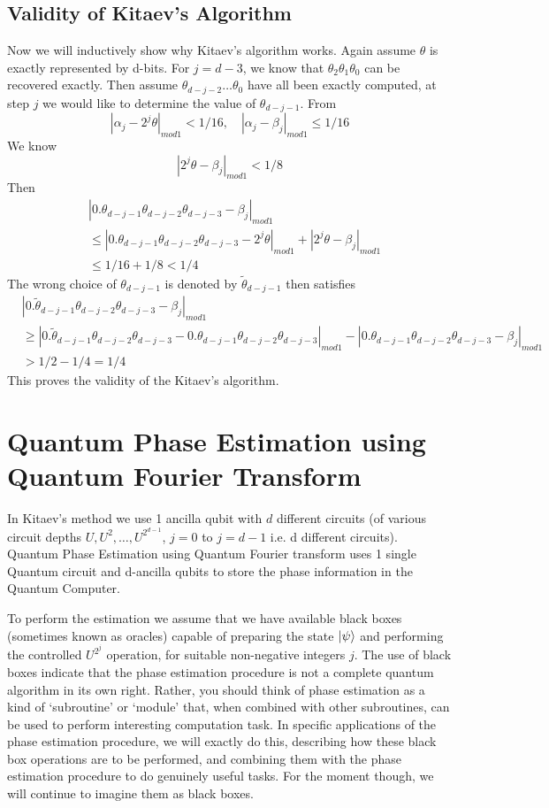 \subsection{Validity of Kitaev's Algorithm}
Now we will inductively show why Kitaev's algorithm works. Again assume $\theta$ is exactly represented by d-bits. For $j=d-3$, we know that $\theta_2\theta_1\theta_0$ can be recovered exactly. Then assume $\theta_{d-j-2}\ldots \theta_0$ have all been exactly computed, at step $j$ we would like to determine the value of $\theta_{d-j-1}$. From
\[
|\alpha_j-2^j\theta|_{mod 1}<1/16, \quad |\alpha_j-\beta_j|_{mod 1}\leq 1/16
\]
We know
\[
|2^j\theta-\beta_j|_{mod 1}<1/8
\]
Then
\begin{align*}
    &|0.\theta_{d-j-1}\theta_{d-j-2}\theta_{d-j-3}-\beta_j|_{mod 1}\\
    &\leq |0.\theta_{d-j-1}\theta_{d-j-2}\theta_{d-j-3}-2^j\theta|_{mod1}+|2^j\theta - \beta_j|_{mod1}\\
    &\leq 1/16 + 1/8<1/4
\end{align*}
The wrong choice of $\theta_{d-j-1}$ is denoted by $\tilde{\theta}_{d-j-1}$ then satisfies
\begin{align*}
    &|0.\tilde{\theta}_{d-j-1}\theta_{d-j-2}\theta_{d-j-3}-\beta_j|_{mod1}\\
    &\geq |0.\tilde{\theta}_{d-j-1}\theta_{d-j-2}\theta_{d-j-3}-0.\theta_{d-j-1}\theta_{d-j-2}\theta_{d-j-3}|_{mod1}-|0.\theta_{d-j-1}\theta_{d-j-2}\theta_{d-j-3}-\beta_j|_{mod1}\\
    &>1/2-1/4=1/4
\end{align*}
This proves the validity of the Kitaev's algorithm.

\section{Quantum Phase Estimation using Quantum Fourier Transform}
In Kitaev's method we use 1 ancilla qubit with $d$ different circuits (of various circuit depths $U, U^2, \ldots, U^{2^{d-1}}$, $j=0$ to $j=d-1$ i.e. d different circuits). Quantum Phase Estimation using Quantum Fourier transform uses 1 single Quantum circuit and d-ancilla qubits to store the phase information in the Quantum Computer. 

To perform the estimation we assume that we have available black boxes (sometimes known as oracles) capable of preparing the state $\ket{\psi}$ and performing the controlled $U^{2^j}$ operation, for suitable non-negative integers $j$. The use of black boxes indicate that the phase estimation procedure is not a complete quantum algorithm in its own right. Rather, you should think of phase estimation as a kind of `subroutine' or `module' that, when combined with other subroutines, can be used to perform interesting computation task. In specific applications of the phase estimation procedure, we will exactly do this, describing how these black box operations are to be performed, and combining them with the phase estimation procedure to do genuinely useful tasks. For the moment though, we will continue to imagine them as black boxes. 

